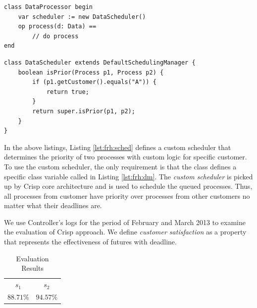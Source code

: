 \begin{center}
\begin{minipage}[t]{0.48\textwidth}
\begin{lstlisting}[label=lst:frh:dm, caption=Data Processor class]
class DataProcessor begin
	var scheduler := new DataScheduler()
	op process(d: Data) ==
		// do process
end
\end{lstlisting}
\end{minipage}
\hfill
\begin{minipage}[t]{0.48\textwidth}
\begin{lstlisting}[label=lst:frh:sched, caption=Custom scheduler]
class DataScheduler extends DefaultSchedulingManager {
	boolean isPrior(Process p1, Process p2) {
		if (p1.getCustomer().equals("A")) {
			return true;
		}
		return super.isPrior(p1, p2);
	}
}
\end{lstlisting}
\end{minipage}
\end{center}

In the above listings, Listing \ref{lst:frh:sched} defines a custom scheduler that determines the priority of two processes with custom logic for specific customer.
To use the custom scheduler, the only requirement is that the class  defines a specific class variable called  in Listing \ref{lst:frh:dm}.
The \textsl{custom scheduler} is picked up by Crisp core architecture and is used to schedule the queued processes.
Thus, all processes from customer  have priority over processes from other customers no matter what their deadlines are.

We use Controller's logs for the period of February and March 2013 to examine the evaluation of Crisp approach.
We define \emph{customer satisfaction} as a property that represents the effectiveness of futures with deadline.

\begin{table}[h]
\begin{tabular}{c c}\thickhline
$s_1$ & $s_2$ \\ \thickhline
$88.71\%$ & $94.57\%$ \\ \hline
\end{tabular}
\caption{Evaluation Results}
\label{tbl:eval}
\end{table}

